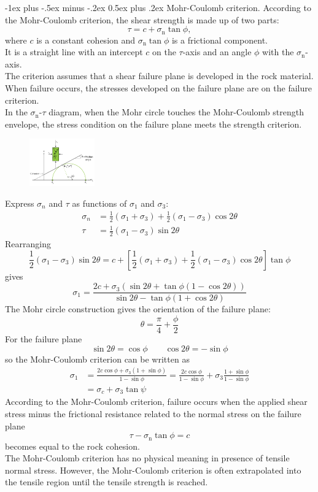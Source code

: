 \documentclass[10pt,landscape,a4paper]{article}
\makeatletter
\renewcommand{\section}{\@startsection{section}{1}{0mm}%
	{-1ex plus -.5ex minus -.2ex}%
	{0.5ex plus .2ex}%
	{\normalfont\large\bfseries}}
\makeatother
\begin{document}
\begin{multicols}{3}
		\section{Mohr-Coulomb criterion.}
		According to the Mohr-Coulomb criterion, the shear strength is made up of two parts:
		\[
			\tau=c+\sigma_\text{n}\tan\phi,
		\]
		where $c$ is a constant cohesion and $\sigma_\text{n}\tan\phi$ is a frictional component.\\
		It is a straight line with an intercept $c$ on the $\tau$-axis and an angle $\phi$ with the $\sigma_\text{n}$-axis.\\
		The criterion assumes that a shear failure plane is developed in the rock material.
		When failure occurs, the stresses developed on the failure plane are on the failure criterion.\\
		In the $\sigma_\text{n}$-$\tau$ diagram, when the Mohr circle touches the Mohr-Coulomb strength envelope, the stress condition on the failure plane meets the strength criterion.
			\begin{figure}[H]
				\centering
				\includegraphics[width=0.25\textwidth]{mohr-coulomb-criterion}
			\end{figure}
		Express $\sigma_n$ and $\tau$ as functions of $\sigma_1$ and $\sigma_3$:
		\begin{align*}
			\sigma_n&=\frac{1}{2}(\sigma_1+\sigma_3)+\frac{1}{2}(\sigma_1-\sigma_3)\cos2\theta\\
			\tau&=\frac{1}{2}(\sigma_1-\sigma_3)\sin2\theta
		\end{align*}
		Rearranging
		\[
			\frac{1}{2}(\sigma_1-\sigma_3)\sin2\theta=c+\left[\frac{1}{2}(\sigma_1+\sigma_3)+\frac{1}{2}(\sigma_1-\sigma_3)\cos2\theta\right]\tan\phi
		\]
		gives
		\[
			\sigma_1=\frac{2c+\sigma_3(\sin2\theta+\tan\phi(1-\cos2\theta))}{\sin2\theta-\tan\phi(1+\cos2\theta)}
		\]
		The Mohr circle construction gives the orientation of the failure plane:
		\[
			\theta=\frac{\pi}{4}+\frac{\phi}{2}
		\]
		For the failure plane
		\[
			\sin 2\theta=\cos\phi \qquad \cos2\theta=-\sin\phi
		\]
		so the Mohr-Coulomb criterion can be written as
			\begin{align*}
				\sigma_1&=\frac{2c\cos\phi+\sigma_3(1+\sin\phi)}{1-\sin\phi}=\frac{2c\cos\phi}{1-\sin\phi}+\sigma_3\frac{1+\sin\phi}{1-\sin\phi}\\
				&=\sigma_c+\sigma_3\tan\psi
			\end{align*}
		According to the Mohr-Coulomb criterion, failure occurs when the applied shear stress minus the frictional resistance related to the normal stress on the failure plane
		\[
			\tau-\sigma_\text{n}\tan\phi=c
		\]
		becomes equal to the rock cohesion.\\
		The Mohr-Coulomb criterion has no physical meaning in presence of tensile normal stress. However, the Mohr-Coulomb criterion is often extrapolated into the tensile region until the tensile strength is reached.
		

\end{multicols}
\end{document}
